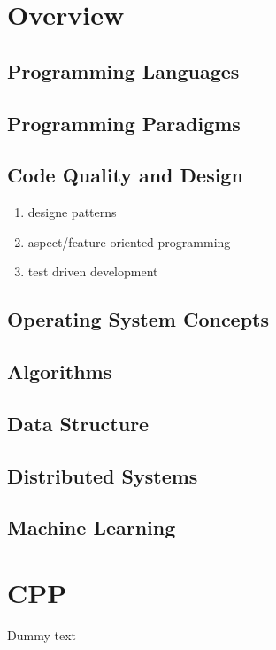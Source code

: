 \documentclass{article}
\begin{document}
\tableofcontents
\newpage

\section{Overview}
\subsection{Programming Languages}
\subsection{Programming Paradigms}
\subsection{Code Quality and Design}
\begin{enumerate}
    \item designe patterns
    \item aspect/feature oriented programming
    \item test driven development
\end{enumerate}
\subsection{Operating System Concepts}
\subsection{Algorithms}
\subsection{Data Structure}
\subsection{Distributed Systems}
\subsection{Machine Learning}

\section{CPP}
Dummy text
\end{document}
